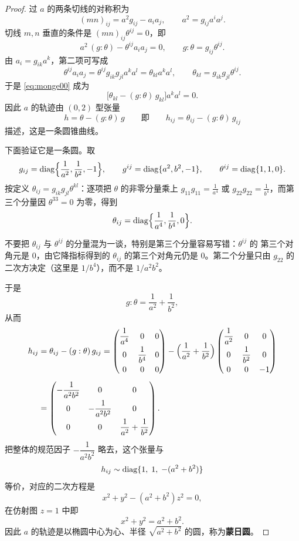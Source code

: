 \begin{proof}
过 $a$ 的两条切线的对称积为
\[
(mn)_{ij}=a^2g_{ij}-a_ia_j,\qquad a^2=g_{ij}a^ia^j .
\]
切线 $m,n$ 垂直的条件是 $(mn)_{ij}\theta^{ij}=0$，即
\begin{equation}
a^2\,(g:\theta)-\theta^{ij}a_ia_j=0,
\qquad g:\theta=g_{ij}\theta^{ij}.
\label{eq:monge00}
\end{equation}
由 $a_i=g_{ik}a^k$，第二项可写成
\[
\theta^{ij}a_ia_j=\theta^{ij}g_{ik}g_{jl}a^ka^l
=\theta_{kl}a^ka^l,
\qquad \theta_{kl}=g_{ik}g_{jl}\theta^{ij}.
\]
于是 \eqref{eq:monge00} 成为
\[
\bigl[\theta_{kl}-(g:\theta)\,g_{kl}\bigr]a^ka^l=0 .
\]
因此 $a$ 的轨迹由 $(0,2)$ 型张量
\begin{equation}
h=\theta-(g:\theta)\,g
\qquad\text{即}\qquad
h_{ij}=\theta_{ij}-(g:\theta)\,g_{ij}
\label{eq:monge-h}
\end{equation}
描述，这是一条圆锥曲线。

下面验证它是一条圆。取
\[
g_{ij}=\operatorname{diag}\Bigl\{\frac{1}{a^2},\frac{1}{b^2},-1\Bigr\},\qquad
g^{ij}=\operatorname{diag}\{a^2,b^2,-1\},\qquad
\theta^{ij}=\operatorname{diag}\{1,1,0\}.
\]
按定义 $\theta_{ij}=g_{ik}g_{jl}\theta^{kl}$：逐项把 $\theta$ 的非零分量乘上
$g_{11}g_{11}=\frac{1}{a^4}$ 或 $g_{22}g_{22}=\frac{1}{b^4}$，而第三个分量因 $\theta^{33}=0$
为零，得到
\[
\theta_{ij}=\operatorname{diag}\Bigl\{\frac{1}{a^4},\frac{1}{b^4},0\Bigr\}.
\]
\begin{remark}
不要把 $\theta_{ij}$ 与 $\theta^{ij}$ 的分量混为一谈，特别是第三个分量容易写错：$\theta^{ij}$ 的
第三个对角元是 $0$，由它降指标得到的 $\theta_{ij}$ 的第三个对角元仍是 $0$。第二个分量只由
$g_{22}$ 的二次方决定（这里是 $1/b^4$），而不是 $1/a^2b^2$。
\end{remark}
于是
\[
g:\theta=\frac{1}{a^2}+\frac{1}{b^2},
\]
从而
\begin{align*}
h_{ij}&=\theta_{ij}-(g:\theta)\,g_{ij}
=
\begin{pmatrix}
\dfrac{1}{a^4} & 0 & 0\\[6pt]
0 & \dfrac{1}{b^4} & 0\\[6pt]
0 & 0 & 0
\end{pmatrix}
-\Bigl(\frac{1}{a^2}+\frac{1}{b^2}\Bigr)
\begin{pmatrix}
\dfrac{1}{a^2} & 0 & 0\\[6pt]
0 & \dfrac{1}{b^2} & 0\\[6pt]
0 & 0 & -1
\end{pmatrix}\\[4pt]
&=
\begin{pmatrix}
-\dfrac{1}{a^2b^2} & 0 & 0\\[6pt]
0 & -\dfrac{1}{a^2b^2} & 0\\[6pt]
0 & 0 & \dfrac{1}{a^2}+\dfrac{1}{b^2}
\end{pmatrix}.
\end{align*}
把整体的规范因子 $-\dfrac{1}{a^2b^2}$ 略去，这个张量与
\[
h_{ij}\sim\operatorname{diag}\{1,\;1,\;-(a^2+b^2)\}
\]
等价，对应的二次方程是
\[
x^2+y^2-(a^2+b^2)z^2=0,
\]
在仿射图 $z=1$ 中即
\[
x^2+y^2=a^2+b^2 .
\]
因此 $a$ 的轨迹是以椭圆中心为心、半径 $\sqrt{a^2+b^2}$ 的圆，称为\textbf{蒙日圆}。
\end{proof}

